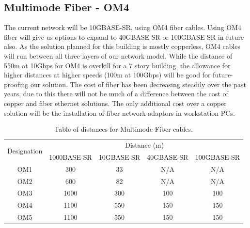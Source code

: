 \subsection{Multimode Fiber - OM4}
The current network will be 10GBASE-SR, using OM4 fiber cables. Using OM4 fiber will give us options to expand to 40GBASE-SR or 100GBASE-SR in future also.
As the solution planned for this building is mostly copperless, OM4 cables will run between all three layers of our network model.
While the distance of 550m at 10Gbps for OM4 is overkill for a 7 story building, the allowance for higher distances at higher speeds (100m at 100Gbps) will be good for future-proofing our solution.
The cost of fiber has been decreasing steadily over the past years, due to this there will not be much of a difference between the cost of copper and fiber ethernet solutions. The only additional cost over a copper solution will be the installation of fiber network adaptors in workstation PCs.
\begin{table}[H]
    \centering
    \begin{tabular}{|ccccc|}
    \hline
    \multicolumn{1}{|c|}{\multirow{2}{*}{Designation}} & \multicolumn{4}{c|}{Distance (m)}                                                                                \\ \cline{2-5} 
    \multicolumn{1}{|c|}{}                             & \multicolumn{1}{c|}{1000BASE-SR} & \multicolumn{1}{c|}{10GBASE-SR} & \multicolumn{1}{c|}{40GBASE-SR} & 100GBASE-SR \\ \hline
    OM1                                                & 300                            & 33                              & N/A                             & N/A         \\ \hline
    OM2                                                & 600                            & 82                              & N/A                             & N/A         \\ \hline
    OM3                                                & 1000                           & 300                             & 100                             & 100         \\ \hline
    OM4                                                & 1100                           & 550                             & 150                             & 150         \\ \hline
    OM5                                                & 1100                           & 550                             & 150                             & 150         \\ \hline
    \end{tabular}
    \caption{Table of distances for Multimode Fiber cables.}
    \label{tab:fiber_distance}
\end{table}

